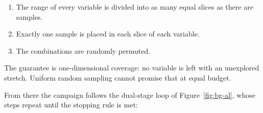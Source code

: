 \begin{enumerate}
  \item The range of every variable is divided into as many equal
        slices as there are samples.

  \item Exactly one sample is placed in each slice of each variable.

  \item The combinations are randomly permuted.
\end{enumerate}

The guarantee is one-dimensional coverage: no variable is left with an
unexplored stretch. Uniform random sampling cannot promise that at
equal budget.

From there the campaign follows the dual-stage loop of
Figure~\ref{fig:bg-al}, whose steps repeat until the stopping rule is
met:

